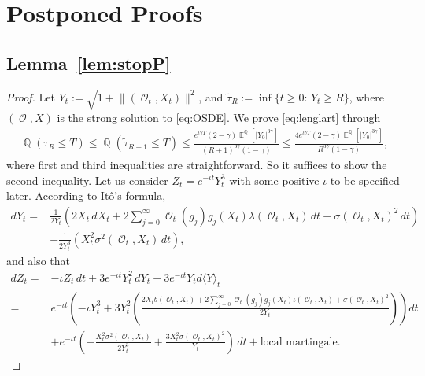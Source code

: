 \documentclass[11pt]{article}
\numberwithin{equation}{section}
\theoremstyle{plain}
\theoremstyle{definition}
\DeclareMathOperator{\E}{\mathbb{E}}
\DeclareMathOperator{\Q}{\mathbb{Q}}
\DeclareMathOperator{\calO}{\mathcal{O}}
\begin{document}
\appendix 

\section{Postponed Proofs} \label{app}
\subsection{Lemma~\ref{lem:stopP}} \label{app:Lemma}
\begin{proof}
Let $Y_t:=\sqrt{1+\lVert(\calO_t,X_t) \rVert^2 }$, and $ \tilde \tau_R:=\inf \{t \geq 0: \, Y_t \geq R \}$, where $(\calO,X)$ is the  strong solution to \eqref{eq:OSDE}. We  prove \eqref{eq:lenglart} through 
\begin{align*}
       \Q( \tau_R \leq T) \leq \Q (\tilde \tau_{R+1} \leq T ) \leq \frac{ e^{\iota \gamma T} (2-\gamma) \E^{\Q}[|Y_0|^{3\gamma}]}{(R+1)^{3 \gamma}(1-\gamma) } \leq \frac{ 4 e^{\iota \gamma T} (2-\gamma) \E^{\Q}[|Y_0|^{3\gamma}]}{R^{3 \gamma}(1-\gamma) },
    \end{align*}
where first and third inequalities are straightforward. So it suffices to show the second inequality. Let us consider $Z_t=e^{-\iota t} Y_t^3$ with some positive $\iota$ to be specified later. According to It\^{o}'s formula, 
 \begin{align*}
     dY_t=&\frac{1}{2Y_t}\left(2X_t \, dX_t +2 \sum_{j=0}^{\infty} \calO_t(g_j) g_j(X_t)\lambda (\calO_t, X_t) \, dt +\sigma(\calO_t,X_t)^2 \, dt \right) \\
     &- \frac{1}{2Y_t^3}\left(X_t^2 \sigma^2(\calO_t,X_t) \, dt \right),
 \end{align*}
 and also that 
 \begin{align*}
     d Z_t= & -\iota Z_t \, dt + 3 e^{-\iota t}  Y_t^2\, dY_t +3 e^{-\iota t} Y_t d \langle Y\rangle_t \\
      = &e^{-\iota t}  \left( -\iota Y_t^3 +   3Y_t^2 \left(\frac{2X_t b(\calO_t,X_t)+2 \sum_{j=0}^{\infty} \calO_t(g_j) g_j(X_t)\iota (\calO_t, X_t)+\sigma(\calO_t,X_t)^2}{2Y_t} \right) \right)dt \\
      & +e^{-\iota t}\left(- \frac{X_t^2 \sigma^2(\calO_t,X_t)} {2Y_t^3}     +\frac{3X_t^2\sigma(\calO_t,X_t)^2}{Y_t} \right) \,dt + \text{local martingale}. 
 \end{align*}


\end{proof}
\end{document}

